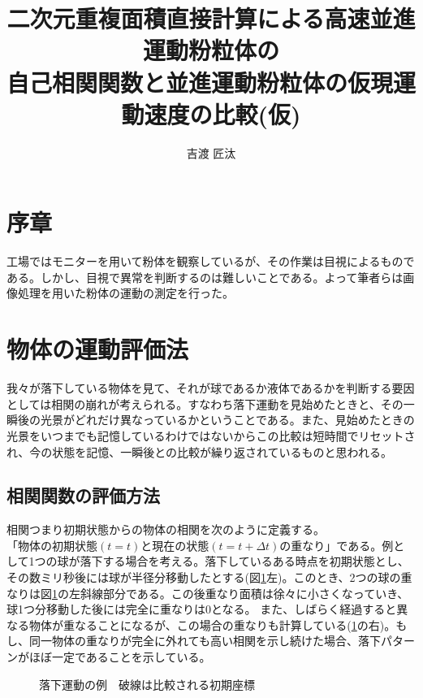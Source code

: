 \documentclass[a4paper,10pt,twocolumn,dvipdfmx]{jsarticle}
\title{二次元重複面積直接計算による高速並進運動粉粒体の\\
自己相関関数と並進運動粉粒体の仮現運動速度の比較(仮)
}
\author{吉渡 匠汰}
\date{ } %
\begin{document}

\section{序章}
工場ではモニターを用いて粉体を観察しているが、その作業は目視によるものである。しかし、目視で異常を判断するのは難しいことである。よって筆者らは画像処理を用いた粉体の運動の測定を行った。
\section{物体の運動評価法}
我々が落下している物体を見て、それが球であるか液体であるかを判断する要因としては相関の崩れが考えられる。すなわち落下運動を見始めたときと、その一瞬後の光景がどれだけ異なっているかということである。また、見始めたときの光景をいつまでも記憶しているわけではないからこの比較は短時間でリセットされ、今の状態を記憶、一瞬後との比較が繰り返されているものと思われる。
\subsection{相関関数の評価方法}
相関つまり初期状態からの物体の相関を次のように定義する。$「物体の初期状態(t=t)と現在の状態(t=t+\Delta t)の重なり」$である。例として1つの球が落下する場合を考える。落下しているある時点を初期状態とし、その数ミリ秒後には球が半径分移動したとする(図\ref{fig:exfall}左)。このとき、2つの球の重なりは図\ref{fig:exfall}の左斜線部分である。この後重なり面積は徐々に小さくなっていき、球1つ分移動した後には完全に重なりは0となる。
また、しばらく経過すると異なる物体が重なることになるが、この場合の重なりも計算している(\ref{fig:exfall}の右)。もし、同一物体の重なりが完全に外れても高い相関を示し続けた場合、落下パターンがほぼ一定であることを示している。
\begin{figure}[hbtp]
\centering
{}
\caption{落下運動の例　破線は比較される初期座標}
\label{fig:exfall}
\end{figure}
\end{document}
